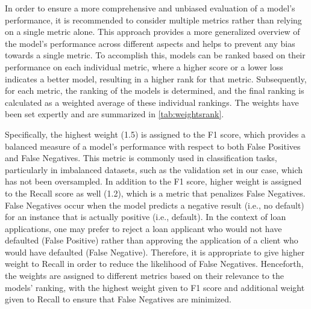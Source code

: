 In order to ensure a more comprehensive and unbiased evaluation of a model's performance, it is recommended to consider multiple metrics rather than relying on a single metric alone. This approach provides a more generalized overview of the model's performance across different aspects and helps to prevent any bias towards a single metric.
To accomplish this, models can be ranked based on their performance on each individual metric, where a higher score or a lower loss indicates a better model, resulting in a higher rank for that metric. Subsequently, for each metric, the ranking of the models is determined, and the final ranking is calculated as a weighted average of these individual rankings.
The weights have been set expertly and are summarized in \autoref{tab:weightsrank}.

Specifically, the highest weight (1.5) is assigned to the F1 score, which provides a balanced measure of a model's performance with respect to both False Positives and False Negatives.
This metric is commonly used in classification tasks, particularly in imbalanced datasets, such as the validation set in our case, which has not been oversampled.
In addition to the F1 score, higher weight is assigned to the Recall score as well (1.2), which is a metric that penalizes False Negatives.
False Negatives occur when the model predicts a negative result (i.e., no default) for an instance that is actually positive (i.e., default).
In the context of loan applications, one may prefer to reject a loan applicant who would not have defaulted (False Positive) rather than approving the application of a client who would have defaulted (False Negative). Therefore, it is appropriate to give higher weight to Recall in order to reduce the likelihood of False Negatives.
Henceforth, the weights are assigned to different metrics based on their relevance to the models' ranking, with the highest weight given to F1 score and additional weight given to Recall to ensure that False Negatives are minimized.

